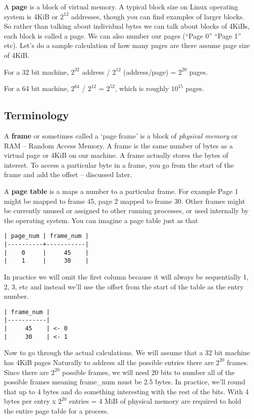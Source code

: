 A \textbf{page} is a block of virtual memory.
A typical block size on Linux operating system is 4KiB or $2^{12}$ addresses, though you can find examples of larger blocks. So rather than talking about individual bytes we can talk about blocks of 4KiBs, each block is called a page. We can also number our pages (``Page 0'' ``Page 1'' etc). Let's do a sample calculation of how many pages are there assume page size of 4KiB.

\begin{shaded*}
For a 32 bit machine, $2^{32}$ address / $2^{12}$ (address/page) = $2^{20}$ pages.

For a 64 bit machine, $2^{64}$ / $2^{12}$ = $2^{52}$, which is roughly $10^{15}$ pages.
\end{shaded*}

\subsection{Terminology}

A \textbf{frame} or sometimes called a `page frame' is a block of \emph{physical memory} or RAM -- Random Access Memory.
A frame is the same number of bytes as a virtual page or 4KiB on our machine.
A frame actually stores the bytes of interest.
To access a particular byte in a frame, you go from the start of the frame and add the offset -- discussed later.

A \textbf{page table} is a maps a number to a particular frame.
For example Page 1 might be mapped to frame 45, page 2 mapped to frame 30.
Other frames might be currently unused or assigned to other running processes, or used internally by the operating system.
You can imagine a page table just as that

\begin{verbatim}
| page_num | frame_num |
|----------+-----------|
|    0     |     45    |
|    1     |     30    |
\end{verbatim}

In practice we will omit the first column because it will always be sequentially 1, 2, 3, etc and instead we'll use the offset from the start of the table as the entry number.


\begin{verbatim}
| frame_num |
|-----------|
|     45    | <- 0
|     30    | <- 1
\end{verbatim}

Now to go through the actual calculations.
We will assume that a 32 bit machine has 4KiB pages
Naturally to address all the possible entries there are $2^{20}$ frames.
Since there are $2^{20}$ possible frames, we will need 20 bits to number all of the possible frames meaning frame\_num must be 2.5 bytes.
In practice, we'll round that up to 4 bytes and do something interesting with the rest of the bits.
With 4 bytes per entry x $2^{20}$ entries = 4 MiB of physical memory are required to hold the entire page table for a process.

